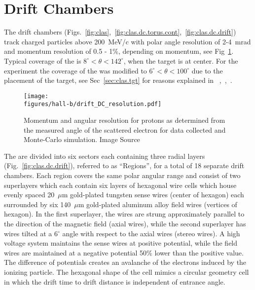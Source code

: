 \section{Drift Chambers}\label{sec:clas.dc}

The  drift chambers  (Figs.~\ref{fig:clas},~\ref{fig:clas.dc.torus.cont},~\ref{fig:clas.dc.drift}) track charged particles above 200~MeV/c with polar angle resolution of 2-4~mrad and momentum resolution of 0.5 - 1\%, depending on momentum, see Fig~\ref{fig:clas.dc.res}. Typical coverage of the  is $8^\circ < \theta < 142^\circ$, when the target is at  center. For the  experiment the coverage of the  was modified to $6^\circ < \theta < 100^\circ$ due to the placement of the target, see Sec~\ref{sec:clas.tgt} for reasons explained in ~\cite{clas.proposal.hyclas},~\cite{clas.proposal.superg},~\cite{clas.proposal.pion}.
\begin{figure}\begin{center}
\texttt{[image: \\figures/hall-b/drift\_DC\_resolution.pdf]}
\caption[Momentum and angular resolution for protons as determined from the measured angle of the scattered electron for data collected and Monte-Carlo simulation]{\label{fig:clas.dc.res}Momentum and angular resolution for protons as determined from the measured angle of the scattered electron for data collected and Monte-Carlo simulation. Image Source~\cite{clas}}
\end{center}\end{figure}

The  are divided into six sectors each containing three radial layers (Fig.~\ref{fig:clas.dc.drift}), referred to as ``Regions'', for a total of 18 separate drift chambers. Each  region covers the same polar angular range and consist of two superlayers which each contain six layers of hexagonal wire cells which house evenly spaced 20~$\mu$m gold-plated tungsten sense wires (center of hexagon) each surrounded by six 140~$\mu$m gold-plated aluminum alloy field wires (vertices of hexagon). In the first superlayer, the wires are strung approximately parallel to the direction of the magnetic field (axial wires), while the second superlayer has wires tilted at a 6$^\circ$ angle with respect to the axial wires (stereo wires). A high voltage system maintains the sense wires at positive potential, while the field wires are maintained at a negative potential 50\% lower than the positive value. The difference of potentials creates an avalanche of the electrons induced by the ionizing particle. The hexagonal shape of the cell mimics a circular geometry cell in which the drift time to drift distance is independent of entrance angle.

